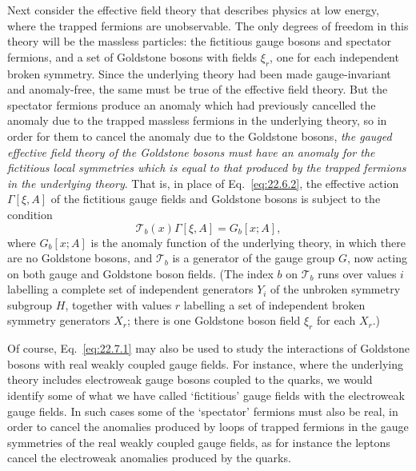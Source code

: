 Next consider the effective field theory that describes physics at low
energy, where the trapped fermions are unobservable. The only degrees of
freedom in this theory will be the massless particles: the fictitious
gauge bosons and spectator fermions, and a set of Goldstone bosons with
fields $\xi_r$, one for each independent broken symmetry. Since the
underlying theory had been made gauge-invariant and anomaly-free, the
same must be true of the effective field theory. But the spectator
fermions produce an anomaly which had previously cancelled the anomaly
due to the trapped massless fermions in the underlying theory, so in
order for them to cancel the anomaly due to the Goldstone bosons,
\emph{the gauged effective field theory of the Goldstone bosons must have
an anomaly for the fictitious local symmetries which is equal to that
produced by the trapped fermions in the underlying theory}. That is, in
place of Eq.~\eqref{eq:22.6.2}, the effective action $\Gamma[\xi,A]$ of
the fictitious gauge fields and Goldstone bosons is subject to the
condition
\begin{equation}
 \mathcal T_b(x)\Gamma[\xi,A]=G_b[x;A],
 \tag{22.7.1}\label{eq:22.7.1}
\end{equation}
where $G_b[x;A]$ is the anomaly function of the underlying theory, in
which there are no Goldstone bosons, and $\mathcal T_b$ is a
generator of the gauge group $G$, now acting on both gauge and Goldstone
boson fields. (The index $b$ on $\mathcal T_b$ runs over values
$i$ labelling a complete set of independent generators $Y_i$ of the
unbroken symmetry subgroup $H$, together with values $r$ labelling a set
of independent broken symmetry generators $X_r$; there is one Goldstone
boson field $\xi_r$ for each $X_r$.)

Of course, Eq.~\eqref{eq:22.7.1} may also be used to study the
interactions of Goldstone bosons with real weakly coupled gauge fields.
For instance, where the underlying theory includes electroweak gauge
bosons coupled to the quarks, we would identify some of what we have
called `fictitious' gauge fields with the electroweak gauge fields. In
such cases some of the `spectator' fermions must also be real, in order
to cancel the anomalies produced by loops of trapped fermions in the
gauge symmetries of the real weakly coupled gauge fields, as for instance
the leptons cancel the electroweak anomalies produced by the quarks.

